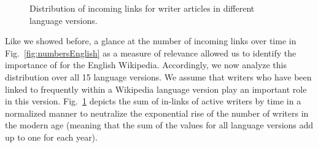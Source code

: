 \documentclass[a4paper,12pt]{scrartcl}
\begin{document}
\begin{figure}
  \centering
    \caption{Distribution of incoming links for writer articles in
      different language versions.}\label{fig:inlinks}
\end{figure}


Like we showed before, a glance at the number of incoming links over
time in Fig.~\ref{fig:numbersEnglish} as a measure of relevance
allowed us to identify the importance of  for the
English Wikipedia.  Accordingly, we now analyze this distribution over
all 15 language versions.
%
We assume that writers who have been linked to frequently within a
Wikipedia language version play an important role in this version.
%
Fig.~\ref{fig:inlinks} depicts the sum of in-links of active writers
by time in a normalized manner to neutralize the exponential rise of
the number of writers in the modern age (meaning that the sum of the
values for all language versions add up to one for each year).

\end{document}
